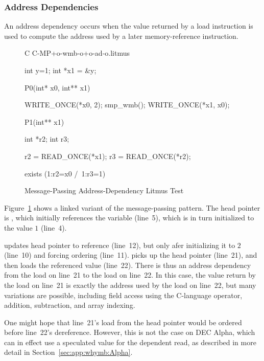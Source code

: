 \subsubsection{Address Dependencies}
\label{sec:advsync:Address Dependencies}

An address dependency occurs when the value returned by a load instruction
is used to compute the address used by a later memory-reference
instruction.

\begin{figure}[tbp]
{ \scriptsize
\begin{verbbox}[\LstLineNo]
C C-MP+o-wmb-o+o-ad-o.litmus

{
int y=1;
int *x1 = &y;
}

P0(int* x0, int** x1) {

  WRITE_ONCE(*x0, 2);
  smp_wmb();
  WRITE_ONCE(*x1, x0);

}

P1(int** x1) {

  int *r2;
  int r3;

  r2 = READ_ONCE(*x1);
  r3 = READ_ONCE(*r2);

}

exists (1:r2=x0 /\ 1:r3=1)
\end{verbbox}
}
\centering
\theverbbox
\caption{Message-Passing Address-Dependency Litmus Test}
\label{fig:advsync:Message-Passing Address-Dependency Litmus Test}
\end{figure}

Figure~\ref{fig:advsync:Message-Passing Address-Dependency Litmus Test}
shows a linked variant of the message-passing pattern.
The head pointer is , which initially
references the  variable  (line~5), which is in turn 
initialized to the value $1$ (line~4).

 updates head pointer  to reference  (line~12),
but only afer initializing it to $2$ (line~10) and forcing ordering
(line~11).
 picks up the head pointer  (line~21), and then loads
the referenced value (line~22).
There is thus an address dependency from the load on line~21 to the
load on line~22.
In this case, the value return by the load on line~21 is exactly the address
used by the load on line~22, but many variations are possible,
including field access using the C-language \co{->} operator,
addition, subtraction, and array indexing.

One might hope that line~21's load from the head pointer would be ordered
before line~22's dereference.
However, this is not the case on DEC Alpha, which can in effect use
a speculated value for the dependent read, as described in more detail in
Section~\ref{sec:app:whymb:Alpha}.

